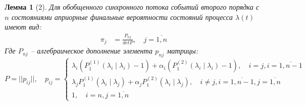 \documentclass{beamer}
\newtheorem{rlemma}{Лемма}
\begin{document}
\begin{frame}
    \begin{rlemma}[2]
        Для обобщенного синхронного потока событий второго порядка с \(n\) состояниями априорные финальные вероятности состояний процесса \(\lambda(t)\) имеют вид:
        \begin{equation}
            \begin{aligned}
            \pi_j&=\frac{P_{nj}}{detP}, \quad j=\overline{1,n}
            \end{aligned}
        \end{equation}
        Где \(P_{nj}\) -- алгебраическое дополнение элемента \(p_{nj}\) матрицы:
        \begin{equation*}
            \scriptstyle P=||p_{ij}||, \quad p_{ij}=\begin{cases}
                \scriptstyle \lambda_i(P_1^{(1)}(\lambda_i\mid\lambda_i)-1)+\alpha_i(P_1^{(2)}(\lambda_i\mid\lambda_i)-1),\quad i=j,i=\overline{1,n-1}\\
                \scriptstyle \lambda_jP_1^{(1)}(\lambda_i\mid\lambda_j)+\alpha_jP_1^{(2)}(\lambda_i\mid\lambda_j),\quad i\ne j,i=\overline{1,n-1},j=\overline{1,n}\\
                \scriptstyle 1, \quad i=n, j=\overline{1,n}
            \end{cases}
        \end{equation*}
    \end{rlemma}
\end{frame}
\end{document}
